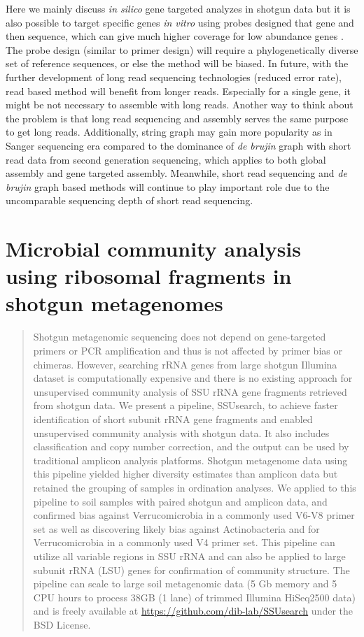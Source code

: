 \documentclass[]{msu-thesis}
\begin{document}
Here we mainly discuss \textit{in silico} gene targeted analyzes in shotgun data but it is also possible to target specific genes \textit{in vitro} using probes designed that gene and then sequence, which can give much higher coverage for low abundance genes \cite{mercer_targeted_2014}. The probe design (similar to primer design) will require a phylogenetically diverse set of reference sequences, or else the method will be biased. In future, with the further development of long read sequencing technologies (reduced error rate), read based method will benefit from longer reads. Especially for a single gene, it might be not necessary to assemble with long reads. Another way to think about the problem is that long read sequencing and assembly serves the same purpose to get long reads. Additionally, string graph may gain more popularity as in Sanger sequencing era compared to the dominance of \textit{de brujin} graph with short read data from second generation sequencing, which applies to both global assembly and gene targeted assembly. Meanwhile, short read sequencing and \textit{de brujin} graph based methods will continue to play important role due to the uncomparable sequencing depth of short read sequencing. 





\chapter{Microbial community analysis using ribosomal fragments in shotgun metagenomes}

\begin{abstract}
Shotgun metagenomic sequencing does not depend on gene-targeted primers or PCR amplification and thus is not affected by primer bias or chimeras. However, searching rRNA genes from large shotgun Illumina dataset is computationally expensive and there is no existing approach for unsupervised community analysis of SSU rRNA gene fragments retrieved from shotgun data. We present a pipeline, SSUsearch, to achieve faster identification of short subunit rRNA gene fragments and enabled unsupervised community analysis with shotgun data. It also includes classification and copy number correction, and the output can be used by traditional amplicon analysis platforms. Shotgun metagenome data using this pipeline yielded higher diversity estimates than amplicon data but retained the grouping of samples in ordination analyses. We applied to this pipeline to soil samples with paired shotgun and amplicon data, and confirmed bias against Verrucomicrobia in a commonly used V6-V8 primer set as well as discovering likely bias against Actinobacteria and for Verrucomicrobia in a commonly used V4 primer set. This pipeline can utilize all variable regions in SSU rRNA and can also be applied to large subunit rRNA (LSU) genes for confirmation of community structure. The pipeline can scale to large soil metagenomic data (5 Gb memory and 5 CPU hours to process 38GB (1 lane) of trimmed Illumina HiSeq2500 data) and is freely available at \url{https://github.com/dib-lab/SSUsearch} under the BSD License.
\end{abstract}
\end{document}
